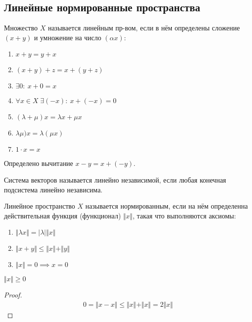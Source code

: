 \documentclass{article}
\begin{document}
\subsection{Линейные нормированные пространства}
\begin{definition}
  Множество $X$ называется линейным пр-вом,
  если в нём определены сложение $(x+y)$ и умножение на число $(\alpha x)$:
  \begin{enumerate}
    \item $x+y=y+x$
    \item $(x+y)+z=x+(y+z)$
    \item $\exists 0: \: x+0=x$
    \item $\forall x \in X \; \exists (-x): \: x+(-x)=0$
    \item $(\lambda+\mu)x=\lambda x+ \mu x$
    \item $\lambda \mu)x=\lambda(\mu x)$
    \item $1 \cdot x=x$
  \end{enumerate}
  Определено вычитание $x-y=x+(-y)$.
\end{definition}
\begin{definition}
  Система векторов называется линейно независимой, если
  любая конечная подсистема линейно независима.
\end{definition}
\begin{definition}
  Линейное пространство $X$ называется нормированным, если
  на нём определенна действительная функция (функционал) $\Vert x \Vert$,
  такая что выполняются аксиомы:
  \begin{enumerate}
    \item $\Vert \lambda x \Vert=|\lambda|\Vert x \Vert   $
    \item $\Vert x+y \Vert \le \Vert x \Vert + \Vert y \Vert$
    \item $\Vert x \Vert=0 \implies x=0$
  \end{enumerate}
\end{definition}
\begin{property}
  $\Vert x \Vert \ge 0$
\end{property}
\begin{proof}
  \begin{gather*}
    0 = \Vert x-x \Vert \le \Vert x \Vert+\Vert x \Vert = 2 \Vert x \Vert
  \end{gather*}
\end{proof}

\end{document}
